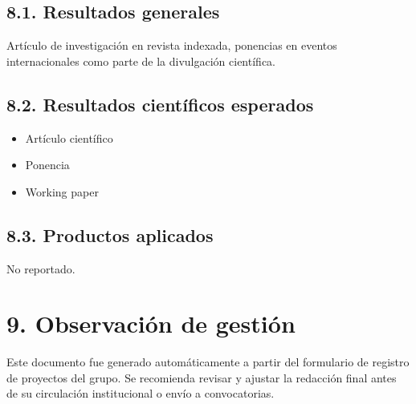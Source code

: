 \documentclass[a4paper,12pt]{article}
\begin{document}
\subsection*{8.1. Resultados generales}
Artículo de investigación en revista indexada, ponencias en eventos internacionales como parte de la divulgación científica.

\subsection*{8.2. Resultados científicos esperados}
\begin{itemize}
    \item Artículo científico
    \item Ponencia
    \item Working paper
\end{itemize}

\subsection*{8.3. Productos aplicados}
No reportado.

\section*{9. Observación de gestión}
Este documento fue generado automáticamente a partir del formulario de registro de proyectos del grupo. Se recomienda revisar y ajustar la redacción final antes de su circulación institucional o envío a convocatorias.
\end{document}
